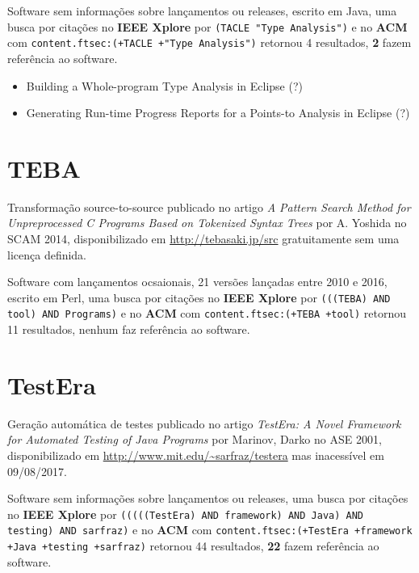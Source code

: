 Software sem informações sobre lançamentos ou releases,
escrito em Java,
uma busca por citações no {\bf IEEE Xplore} por
\texttt{(TACLE "Type Analysis")}
e no {\bf ACM} com
\texttt{content.ftsec:(+TACLE +"Type Analysis")}
retornou
4 resultados,
{\bf 2} fazem referência ao software.

\begin{itemize}
\item Building a Whole-program Type Analysis in Eclipse (?)
\item Generating Run-time Progress Reports for a Points-to Analysis in Eclipse (?)
\end{itemize}

\section{TEBA}

Transformação source-to-source
publicado no artigo {\it A Pattern Search Method for Unpreprocessed C Programs Based on Tokenized Syntax Trees}
por A. Yoshida
no SCAM 2014,
disponibilizado em \url{http://tebasaki.jp/src}
gratuitamente
sem uma licença definida.

Software com lançamentos ocsaionais,
21 versões lançadas
entre 2010 e 2016,
escrito em Perl,
uma busca por citações no {\bf IEEE Xplore} por
\texttt{(((TEBA) AND tool) AND Programs)}
e no {\bf ACM} com
\texttt{content.ftsec:(+TEBA +tool)}
retornou
11 resultados,
nenhum faz referência ao software.


\section{TestEra}

Geração automática de testes
publicado no artigo {\it TestEra: A Novel Framework for Automated Testing of Java Programs}
por Marinov, Darko
no ASE 2001,
disponibilizado em \url{http://www.mit.edu/~sarfraz/testera}
mas inacessível em 09/08/2017.

Software sem informações sobre lançamentos ou releases,
uma busca por citações no {\bf IEEE Xplore} por
\texttt{(((((TestEra) AND framework) AND Java) AND testing) AND sarfraz)}
e no {\bf ACM} com
\texttt{content.ftsec:(+TestEra +framework +Java +testing +sarfraz)}
retornou
44 resultados,
{\bf 22} fazem referência ao software.

